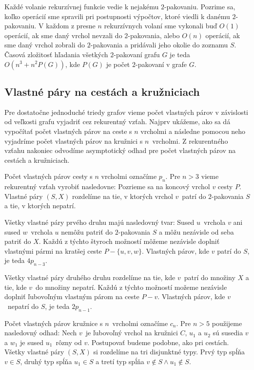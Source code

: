 Každé volanie rekurzívnej funkcie vedie k nejakému $2$-pakovaniu. Pozrime sa, koľko operácií sme
spravili pri postupnosti výpočtov, ktoré viedli k danému $2$-pakovaniu. V každom z presne $n$
rekurzívnych volaní sme vykonali buď $O(1)$ operácií, ak sme daný vrchol nevzali do $2$-pakovania,
alebo $O(n)$ operácií, ak sme daný vrchol zobrali do $2$-pakovania a pridávali jeho okolie do
zoznamu $S$. Časová zložitosť hľadania všetkých $2$-pakovaní grafu $G$ je teda $O(n^3 + n^2P(G))$,
kde $P(G)$ je počet $2$-pakovaní v grafe $G$.

\subsection{Vlastné páry na cestách a kružniciach}

Pre dostatočne jednoduché triedy grafov vieme počet vlastných párov v závislosti
od veľkosti grafu vyjadriť cez rekurentný vzťah. Najprv ukážeme, ako sa dá vypočítať počet
vlastných párov na ceste s $n$ vrcholmi a následne pomocou neho vyjadríme počet vlastných
párov na kružnici s $n$ vrcholmi. Z rekurentného vzťahu nakoniec odvodíme asymptotický odhad
pre počet vlastných párov na cestách a kružniciach.

Počet vlastných párov cesty s $n$ vrcholmi označíme $p_n$. Pre $n > 3$ vieme rekurentný
vzťah vyrobiť nasledovne: Pozrieme sa na koncový vrchol $v$ cesty $P$. Vlastné páry $(S,X)$ rozdelíme
na tie, v ktorých vrchol $v$ patrí do $2$-pakovania $S$ a tie, v ktorých nepatrí.

Všetky vlastné páry
prvého druhu majú nasledovný tvar: Sused $u$ vrchola $v$ ani sused $w$ vrchola $u$ nemôžu
patriť do $2$-pakovania $S$ a môžu nezávisle od seba patriť do $X$. Každú z týchto štyroch
možností môžeme nezávisle doplniť vlastnými pármi na kratšej ceste $P - \{u, v, w\}$.
Vlastných párov, kde $v$ patrí do $S$, je teda $4p_{n-3}$.

Všetky vlastné páry druhého druhu rozdelíme na tie, kde $v$ patrí do množiny $X$ a tie, kde $v$ do množiny
nepatrí. Každú z týchto možností možeme nezávisle doplniť ľubovoľným vlastným párom na ceste $P - v$.
Vlastných párov, kde $v$ nepatrí do $S$, je teda $2p_{n-1}$.

Počet vlastných párov kružnice s $n$ vrcholmi označíme $c_n$. Pre $n > 5$ použijeme nasledovný odhad:
Nech $v$ je ľubovoľný vrchol na kružnici $C$, $u_1$ a $u_2$ sú susedia $v$ a $w_1$ je sused $u_1$ rôzny od $v$.
Postupovať budeme podobne, ako pri cestách. Všetky vlastné páry $(S,X)$ si rozdelíme na tri disjunktné
typy. Prvý typ spĺňa $v \in S$, druhý typ spĺňa $u_1 \in S$ a tretí typ spĺňa $v \notin S \wedge u_1 \notin S$.

